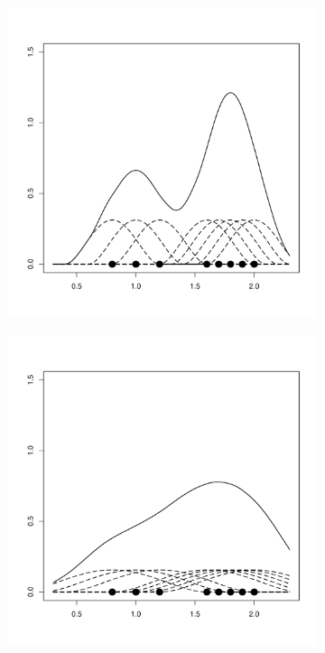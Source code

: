 \begin{figure}[H]
\begin{subfigure}[t]{0.32\textwidth}
        \includegraphics[width=\textwidth]{img/kernel1d-04}
        \label{fig:theory:kernel1d:04}
    \end{subfigure}
    \begin{subfigure}[t]{0.32\textwidth}
        \includegraphics[width=\textwidth]{img/kernel1d-08}

\end{subfigure}
\end{figure}
